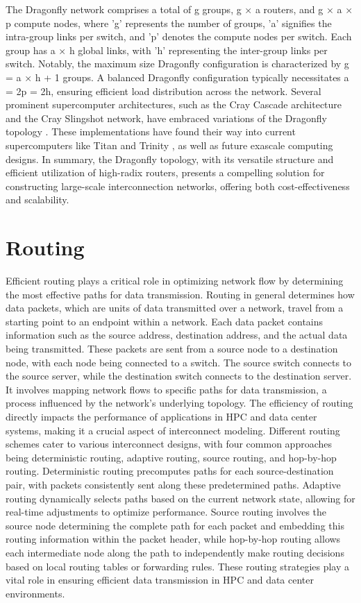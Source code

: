 The Dragonfly network comprises a total of
g groups, g × a routers, and g × a × p compute nodes, where 'g' represents the
number of groups, 'a' signifies the intra-group links per switch, and 'p'
denotes the compute nodes per switch. Each group has a × h global links, with
'h' representing the inter-group links per switch. Notably, the maximum size
Dragonfly configuration is characterized by g = a × h + 1 groups.  A balanced
Dragonfly configuration typically necessitates a = 2p = 2h, ensuring efficient
load distribution across the network.  Several prominent supercomputer
architectures, such as the Cray Cascade architecture and the Cray Slingshot
network, have embraced variations of the Dragonfly topology \cite{faanes2012cray, de2020depth}. These
implementations have found their way into current supercomputers like Titan \cite{titan} and
Trinity \cite{archer2015trinity}, as well as future exascale computing designs.  In summary, the
Dragonfly topology, with its versatile structure and efficient utilization of
high-radix routers, presents a compelling solution for constructing large-scale
interconnection networks, offering both cost-effectiveness and scalability.

\section{Routing}

Efficient routing plays a critical role in optimizing network flow by determining the most effective paths for data transmission. Routing in general determines how data packets, which are units of data transmitted over a network, travel from a starting point to an endpoint within a network. Each data packet contains information such as the source address, destination address, and the actual data being transmitted. These packets are sent from a source node to a destination node, with each node being connected to a switch. The source switch connects to the source server, while the destination switch connects to the destination server. It involves mapping network flows to specific paths for data transmission, a process influenced by the network's underlying topology. The efficiency of routing directly impacts the performance of applications in HPC and data center systems, making it a crucial aspect of interconnect modeling. Different routing schemes cater to various interconnect designs, with four common approaches being deterministic routing, adaptive routing, source routing, and hop-by-hop routing. Deterministic routing precomputes paths for each source-destination pair, with packets consistently sent along these predetermined paths. Adaptive routing dynamically selects paths based on the current network state, allowing for real-time adjustments to optimize performance. Source routing involves the source node determining the complete path for each packet and embedding this routing information within the packet header, while hop-by-hop routing allows each intermediate node along the path to independently make routing decisions based on local routing tables or forwarding rules. These routing strategies play a vital role in ensuring efficient data transmission in HPC and data center environments.

